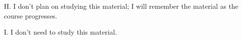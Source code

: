\documentclass{ximera}
\begin{document}
\begin{problem}
    \begin{multipleChoice}
    \end{multipleChoice}
    
    H. I don't plan on studying this material; I will remember the material as the course progresses. 

    \begin{multipleChoice}
    \end{multipleChoice}
    
    I. I don't need to study this material. 

    \begin{multipleChoice}
    \end{multipleChoice}

\end{problem}


%
\end{document}
